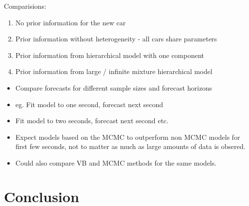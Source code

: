 \documentclass[12pt,a4paper]{article}\usepackage[]{graphicx}\usepackage[]{color}
\begin{document}
Comparisions:
\begin{enumerate}
\item No prior information for the new car
\item Prior information without heterogeneity - all cars share parameters
\item Prior information from hierarchical model with one component
\item Prior information from large / infinite mixture hierarchical model
\end{enumerate}

\begin{itemize}
\item Compare forecasts for different sample sizes and forecast horizons
\item eg. Fit model to one second, forecast next second
\item Fit model to two seconds, forecast next second etc.
\item Expect models based on the MCMC to outperform non MCMC models for first few seconds, not to matter as much as large amounts of data is obsered.
\item Could also compare VB and MCMC methods for the same models.
\end{itemize}

\section{Conclusion}
\end{document}
